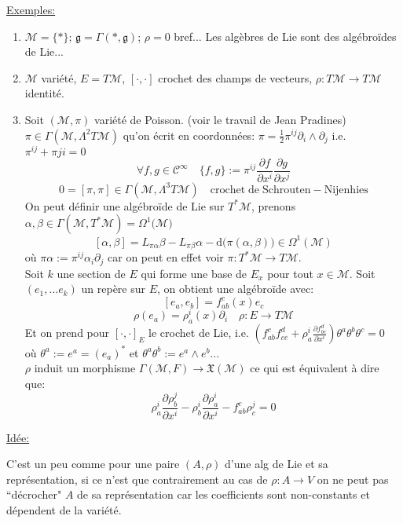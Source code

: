 \documentclass[a4paper,11pt]{article}
\renewcommand{\d}{{\mathrm{d}}}
\newcommand{\e}{{\mathrm{e}}}
\newcommand{\dr}[2]{\frac{\partial {#1}}{\partial{#2}}}
\begin{document}
\noindent\underline{Exemples:}
\begin{enumerate}
\item $\mathcal{M}=\{*\}$; $\mathfrak{g}=\Gamma(*,\mathfrak{g})$; $\rho=0$ bref... Les algèbres de Lie sont des algébroïdes de Lie...
\item $\mathcal{M}$ variété, $E=T\mathcal{M}$, $[\cdot,\cdot]$ crochet des champs de vecteurs, $\rho:T\mathcal{M}\to T\mathcal{M}$ identité.
\item Soit $(\mathcal{M},\pi)$ variété de Poisson. (voir le travail de Jean Pradines)\\
$\pi\in\Gamma(\mathcal{M},\Lambda^2T\mathcal{M})$ qu'on écrit en coordonnées: $\pi = \frac12\pi^{ij}\partial_i\wedge\partial_j$ i.e. $\pi^{ij}+\pi{ji}=0$
$$\forall f,g\in\mathcal{C}^\infty \quad \{f,g\} := \pi^{ij}\dr f{x^i}\dr g{x^j}$$
$$0=[\pi,\pi]\in\Gamma(\mathcal{M},\Lambda^3T\mathcal{M}) \quad \mathrm{crochet}\;\d\e\;\mathrm{Schrouten}-\mathrm{Nijenhies}$$
On peut définir une algébroïde de Lie sur $T^*\mathcal{M}$, prenons $\alpha,\beta\in\Gamma( \mathcal{M},T^*\mathcal{M}) =\Omega^1(\mathcal{M)}$
$$[\alpha,\beta]=L_{\pi\alpha}\beta - L_{\pi\beta}\alpha - \d\Big(\pi(\alpha,\beta)\Big)\in\Omega^1(\mathcal{M})$$
où $\pi\alpha:=\pi^{ij}\alpha_i\partial_j$ car on peut en effet voir $\pi:T^*\mathcal{M}\to T\mathcal{M}$.\\
Soit $k$ une section de $E$ qui forme une base de $E_x$ pour tout $x\in\mathcal{M}$. Soit $(e_1,...e_k)$ un repère sur $E$, on obtient une algébroïde  avec:
$$[e_a,e_b]=f^c_{ab}(x)e_c$$
$$\rho(e_a)=\rho^i_a(x)\partial_i \quad \rho:E\to T\mathcal{M}$$
Et on prend pour $[\cdot,\cdot]_E$ le crochet de Lie, i.e. $\left(f^c_{ab}f^d_{ce}+\rho^i_a\dr{f^d_{bc}}{x^i}\right)\theta^a\theta^b\theta^c=0$\\
où $\theta^a:=e^a=(e_a)^*$ et $\theta^a\theta^b:=e^a\wedge e^b$...\\
$\rho$ induit un morphisme $\Gamma(\mathcal M, F) \to \mathfrak{X}(\mathcal M)$ ce qui est équivalent à dire que:
$$\rho^i_a\dr{\rho^j_b}{x^i}-\rho^i_b\dr{\rho^i_a}{x^i} - f^c_{ab}\rho^j_c = 0$$
\end{enumerate}
\underline{Idée:}

C'est un peu comme pour une paire $(A,\rho)$ d'une alg de Lie et sa représentation, si ce n'est que contrairement au cas de $\rho:A\to V$ on ne peut pas ``décrocher" $A$ de sa représentation car les coefficients sont non-constants et dépendent de la variété.\\
\end{document}
